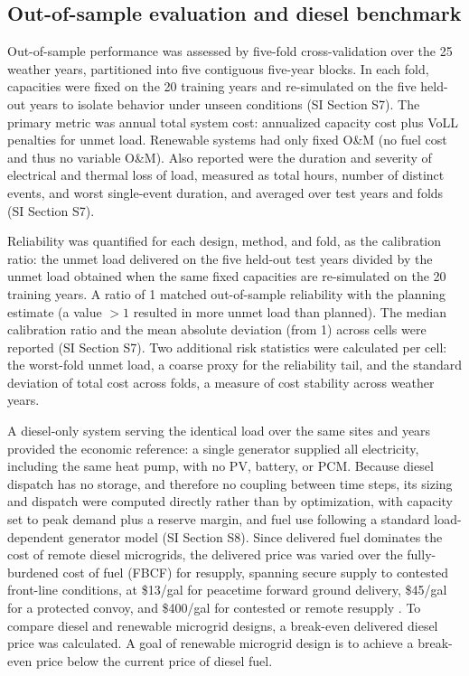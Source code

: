 \documentclass[
  journal=large,
  manuscript=article-type,
  year=2020,
  volume=37,
]{cup-journal}
\begin{document}
\subsection{Out-of-sample evaluation and diesel benchmark}

Out-of-sample performance was assessed by five-fold cross-validation over the 25 weather years, partitioned into five contiguous five-year blocks. In each fold, capacities were fixed on the 20 training years and re-simulated on the five held-out years to isolate behavior under unseen conditions (SI Section S7). The primary metric was annual total system cost: annualized capacity cost plus VoLL penalties for unmet load. Renewable systems had only fixed O\&M (no fuel cost and thus no variable O\&M). Also reported were the duration and severity of electrical and thermal loss of load, measured as total hours, number of distinct events, and worst single-event duration, and averaged over test years and folds (SI Section S7).

Reliability was quantified for each design, method, and fold, as the calibration ratio: the unmet load delivered on the five held-out test years divided by the unmet load obtained when the same fixed capacities are re-simulated on the 20 training years. A ratio of 1 matched out-of-sample reliability with the planning estimate (a value $>1$ resulted in more unmet load than planned). The median calibration ratio and the mean absolute deviation (from 1) across cells were reported (SI Section S7). Two additional risk statistics were calculated per cell: the worst-fold unmet load, a coarse proxy for the reliability tail, and the standard deviation of total cost across folds, a measure of cost stability across weather years.

A diesel-only system serving the identical load over the same sites and years provided the economic reference: a single generator supplied all electricity, including the same heat pump, with no PV, battery, or PCM. Because diesel dispatch has no storage, and therefore no coupling between time steps, its sizing and dispatch were computed directly rather than by optimization, with capacity set to peak demand plus a reserve margin, and fuel use following a standard load-dependent generator model (SI Section S8). Since delivered fuel dominates the cost of remote diesel microgrids, the delivered price was varied over the fully-burdened cost of fuel (FBCF) for resupply, spanning secure supply to contested front-line conditions, at \$13/gal for peacetime forward ground delivery, \$45/gal for a protected convoy, and \$400/gal for contested or remote resupply \parencite{ref45,ref46,ref47}. To compare diesel and renewable microgrid designs, a break-even delivered diesel price was calculated. A goal of renewable microgrid design is to achieve a break-even price below the current price of diesel fuel.
\end{document}
